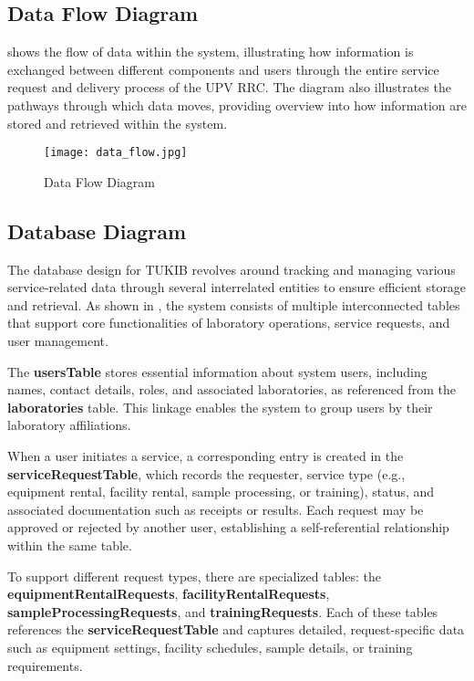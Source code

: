 \newpage

\subsection{Data Flow Diagram}

 shows the flow of data within the system, illustrating how information is exchanged between different components and users through the entire service request and delivery process of the UPV RRC. The diagram also illustrates the pathways through which data moves, providing overview into how information are stored and retrieved within the system.

\begin{figure}[h]
	\centering 
	\texttt{[image: data\_flow.jpg]}
	\caption{Data Flow Diagram}
	\label{fig:data_flow}
\end{figure}

\subsection{Database Diagram}

The database design for TUKIB revolves around tracking and managing various service-related data through several interrelated entities to ensure efficient storage and retrieval. As shown in , the system consists of multiple interconnected tables that support core functionalities of laboratory operations, service requests, and user management.

The \textbf{usersTable} stores essential information about system users, including names, contact details, roles, and associated laboratories, as referenced from the \textbf{laboratories} table. This linkage enables the system to group users by their laboratory affiliations.

When a user initiates a service, a corresponding entry is created in the \textbf{serviceRequestTable}, which records the requester, service type (e.g., equipment rental, facility rental, sample processing, or training), status, and associated documentation such as receipts or results. Each request may be approved or rejected by another user, establishing a self-referential relationship within the same table.

To support different request types, there are specialized tables: the \textbf{equipmentRentalRequests}, \textbf{facilityRentalRequests}, \textbf{sampleProcessingRequests}, and \textbf{trainingRequests}. Each of these tables references the \textbf{serviceRequestTable} and captures detailed, request-specific data such as equipment settings, facility schedules, sample details, or training requirements.

